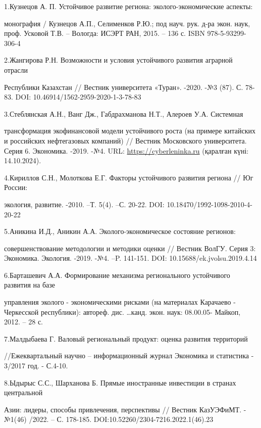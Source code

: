 \begin{references}
1.Кузнецов А. П. Устойчивое развитие региона: эколого-экономические
аспекты:

монография / Кузнецов А.П., Селименков Р.Ю.; под науч. рук. д-ра экон.
наук, проф. Усковой Т.В. -- Вологда: ИСЭРТ РАН, 2015. -- 136 с. ISBN
978-5-93299-306-4

2.Жангирова Р.Н. Возможности и условия устойчивого развития аграрной
отрасли

Республики Казахстан // Вестник университета «Туран». -2020. -№3 (87).
С. 78-83. DOI: 10.46914/1562-2959-2020-1-3-78-83

3.Стеблянская А.Н., Ванг Дж., Габдрахманова Н.Т., Алероев У.А. Системная

трансформация экофинансовой модели устойчивого роста (на примере
китайских и российских нефтегазовых компаний) // Вестник Московского
университета. Серия 6. Экономика. -2019. -№4. URL:
\href{https://cyberleninka.ru/article/n/sistemnaya-transformatsiya-ekofinansovoy-modeli-ustoychivogo-rosta-na-primere-kitayskih-i-rossiyskih-neftegazovyh-kompaniy}{https://cyberleninka.ru}
(қаралған күні: 14.10.2024).

4.Кириллов С.Н., Молоткова Е.Г. Факторы устойчивого развития региона //
Юг России:

экология, развитие. -2010. --Т. 5(4). --С. 20-22. DOI:
10.18470/1992-1098-2010-4-20-22

5.Аникина И.Д., Аникин А.А. Эколого-экономическое состояние регионов:

совершенствование методологии и методики оценки // Вестник ВолГУ. Серия
3: Экономика. Экология. -2019. -№4. --P. 141-151. DOI:
10.15688/ek.jvolsu.2019.4.14

6.Барташевич А.А. Формирование механизма регионального устойчивого
развития на базе

управления эколого - экономическими рисками (на материалах Карачаево -
Черкесской республики): автореф. дис. \ldots канд. экон. наук: 08.00.05-
Майкоп, 2012. -- 28 с.

7.Малдыбаева Г. Валовый региональный продукт: оценка развития территорий

//Ежеквартальный научно -- информационный журнал Экономика и статистика
- 3/2017 год. - С.4-10.

8.Ыдырыс С.С., Шарханова Б. Прямые иностранные инвестиции в странах
центральной

Азии: лидеры, способы привлечения, перспективы // Вестник КазУЭФиМТ.
-№1(46) /2022. -- С. 178-185. DOI:10.52260/2304-7216.2022.1(46).23


\end{references}
